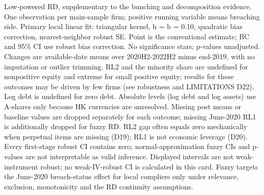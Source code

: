 \begin{table}[!htbp]
\centering\small
\caption{Supplementary fuzzy RD: weak first stage}
\label{tab:t024_rd_fuzzy}
\par\smallskip
\begin{minipage}{\linewidth}\footnotesize
Low-powered RD, supplementary to the bunching and decomposition evidence. One observation per main-sample firm; positive running variable means breaching side. Primary local linear fit: triangular kernel, h = b = 0.10, quadratic bias correction, nearest-neighbor robust SE. Point is the conventional estimate; BC and 95\% CI use robust bias correction. No significance stars; p-values unadjusted. Changes are available-date means over 2020H2-2022H2 minus end-2019, with no imputation or outlier trimming. RL2 and the minority share are undefined for nonpositive equity and extreme for small positive equity; results for these outcomes may be driven by few firms (see robustness and LIMITATIONS D22). Log debt is undefined for zero debt. Absolute levels (log debt and log assets) use A-shares only because HK currencies are unresolved. Missing post means or baseline values are dropped separately for each outcome; missing June-2020 RL1 is additionally dropped for fuzzy RD. RL2 gap often equals zero mechanically when perpetual items are missing (D19); RL1 is not economic leverage (D20). Every first-stage robust CI contains zero; normal-approximation fuzzy CIs and p-values are not interpretable as valid inference. Displayed intervals are not weak-instrument robust; no weak-IV-robust CI is calculated in this card. Fuzzy targets the June-2020 breach-status effect for local compliers only under relevance, exclusion, monotonicity and the RD continuity assumptions.

\end{minipage}
\end{table}
